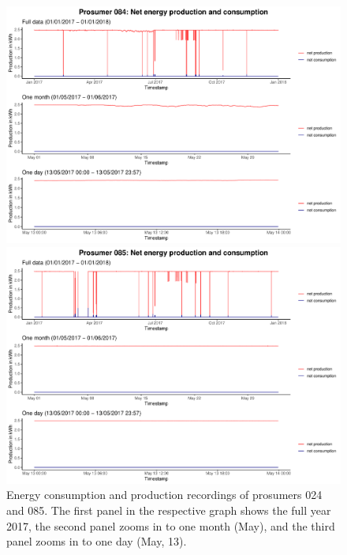 \begin{figure}
\centering
\begin{minipage}[h]{\dimexpr.5\textwidth-0.15em}
\includegraphics[width=\textwidth]{thesis/graphs/timeseries/p084_prod&cons.pdf}
\end{minipage}
\begin{minipage}[h]{\dimexpr.5\textheight-0.15em}
\includegraphics[width=\textwidth]{thesis/graphs/timeseries/p085_prod&cons.pdf}
\end{minipage}

\caption[Energy consumption and production recordings of prosumers 084 and 085]{Energy consumption and production recordings of prosumers 024 and 085. The first panel in the respective graph shows the full year 2017, the second panel zooms in to one month (May), and the third panel zooms in to one day (May, 13). \quantnet}
\label{Fig:energyconsprod_p084p085}
\end{figure}

